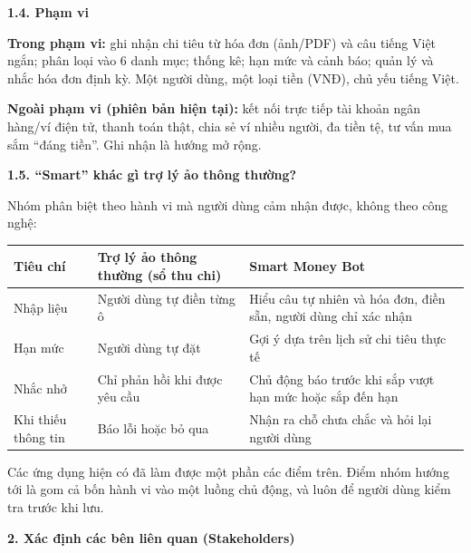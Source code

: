 \documentclass[a4paper,14pt]{extarticle}
\renewcommand{\arraystretch}{1.08}
\newcommand{\TableText}{\footnotesize}
\newcommand{\TableStart}{%
    \begingroup
    \TableText
    \renewcommand{\arraystretch}{1.05}
}
\newcommand{\TableEnd}{\endgroup}
\begin{document}
\vspace{0.5cm}

{\normalsize\bfseries 1.4. Phạm vi}

\textbf{Trong phạm vi:} ghi nhận chi tiêu từ hóa đơn (ảnh/PDF) và
câu tiếng Việt ngắn; phân loại vào 6 danh mục; thống kê; hạn mức
và cảnh báo; quản lý và nhắc hóa đơn định kỳ. Một người dùng,
một loại tiền (VNĐ), chủ yếu tiếng Việt.

\textbf{Ngoài phạm vi (phiên bản hiện tại):} kết nối trực tiếp tài
khoản ngân hàng/ví điện tử, thanh toán thật, chia sẻ ví nhiều
người, đa tiền tệ, tư vấn mua sắm ``đáng tiền''. Ghi nhận là
hướng mở rộng.

\vspace{0.5cm}

{\normalsize\bfseries 1.5. ``Smart'' khác gì trợ lý ảo thông thường?}

Nhóm phân biệt theo hành vi mà người dùng cảm nhận được, không
theo công nghệ:

\TableStart
\begingroup
\normalsize
\begin{tabularx}{\textwidth}{
    |P{2.6cm}|P{6.4cm}|Y|
}
\hline
\textbf{Tiêu chí}
& \textbf{Trợ lý ảo thông thường (sổ thu chi)}
& \textbf{Smart Money Bot}
\\
\hline
Nhập liệu
& Người dùng tự điền từng ô
& Hiểu câu tự nhiên và hóa đơn, điền sẵn, người dùng chỉ xác nhận
\\
\hline
Hạn mức
& Người dùng tự đặt
& Gợi ý dựa trên lịch sử chi tiêu thực tế
\\
\hline
Nhắc nhở
& Chỉ phản hồi khi được yêu cầu
& Chủ động báo trước khi sắp vượt hạn mức hoặc sắp đến hạn
\\
\hline
Khi thiếu thông tin
& Báo lỗi hoặc bỏ qua
& Nhận ra chỗ chưa chắc và hỏi lại người dùng
\\
\hline
\end{tabularx}
\endgroup
\TableEnd

Các ứng dụng hiện có đã làm được một phần các điểm trên. Điểm
nhóm hướng tới là gom cả bốn hành vi vào một luồng chủ động, và
luôn để người dùng kiểm tra trước khi lưu.

\newpage

\vspace{0.5cm}

{\large\bfseries 2. Xác định các bên liên quan (Stakeholders)}
\end{document}
